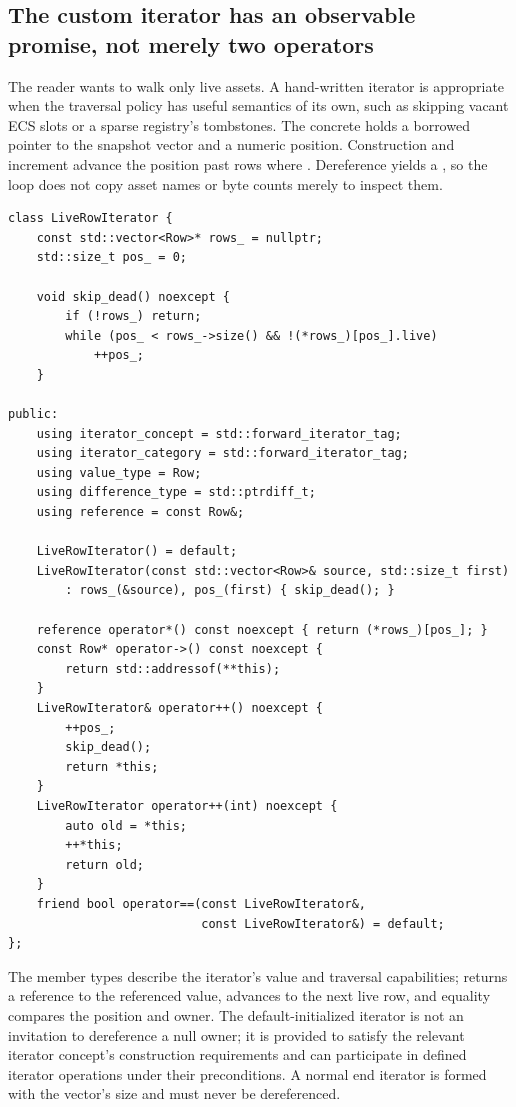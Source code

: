 \subsection{The custom iterator has an observable promise, not merely two operators}\label{05-engine-i-ch006-the-custom-iterator-has-an-observable-promise-not-merely-two-operators}

\hypertarget{05-engine-i-ch006-the-custom-iterator-has-an-observable-promise-not-merely-two-operators}{}

The reader wants to walk only live assets. A hand-written iterator is appropriate when the traversal policy has useful semantics of its own, such as skipping vacant ECS slots or a sparse registry's tombstones. The concrete  holds a borrowed pointer to the snapshot vector and a numeric position. Construction and increment advance the position past rows where . Dereference yields a , so the loop does not copy asset names or byte counts merely to inspect them.

\begin{verbatim}
class LiveRowIterator {
    const std::vector<Row>* rows_ = nullptr;
    std::size_t pos_ = 0;

    void skip_dead() noexcept {
        if (!rows_) return;
        while (pos_ < rows_->size() && !(*rows_)[pos_].live)
            ++pos_;
    }

public:
    using iterator_concept = std::forward_iterator_tag;
    using iterator_category = std::forward_iterator_tag;
    using value_type = Row;
    using difference_type = std::ptrdiff_t;
    using reference = const Row&;

    LiveRowIterator() = default;
    LiveRowIterator(const std::vector<Row>& source, std::size_t first)
        : rows_(&source), pos_(first) { skip_dead(); }

    reference operator*() const noexcept { return (*rows_)[pos_]; }
    const Row* operator->() const noexcept {
        return std::addressof(**this);
    }
    LiveRowIterator& operator++() noexcept {
        ++pos_;
        skip_dead();
        return *this;
    }
    LiveRowIterator operator++(int) noexcept {
        auto old = *this;
        ++*this;
        return old;
    }
    friend bool operator==(const LiveRowIterator&,
                           const LiveRowIterator&) = default;
};
\end{verbatim}

The member types describe the iterator's value and traversal capabilities;  returns a reference to the referenced value,  advances to the next live row, and equality compares the position and owner. The default-initialized iterator is not an invitation to dereference a null owner; it is provided to satisfy the relevant iterator concept's construction requirements and can participate in defined iterator operations under their preconditions. A normal end iterator is formed with the vector's size and must never be dereferenced.

